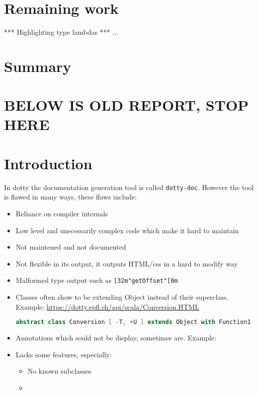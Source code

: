 \documentclass{report}
\begin{document}
\chapter{Remaining work}
*** Highlighting type lambdas
*** ...

\chapter{Summary}

























\chapter{BELOW IS OLD REPORT, STOP HERE}

\chapter{Introduction}
In dotty the documentation generation tool is called \texttt{dotty-doc}. However the tool is flawed in many ways, these flaws include:
\begin{itemize}
    \item Reliance on compiler internals
    \item Low level and unecessarily complex code which make it hard to maintain
    \item Not maintened and not documented
    \item Not flexible in its output, it outputs HTML/css in a hard to modify way
    \item Malformed type output such as \texttt{[32m"getOffset"[0m}
    \item Classes often show to be extending Object instead of their superclass. Example: \url{https://dotty.epfl.ch/api/scala/Conversion.HTML}
\begin{lstlisting}[language=scala]
abstract class Conversion [ -T, +U ] extends Object with Function1
\end{lstlisting}
    \item Annotations which sould not be display, sometimes are. Example:
    \item Lacks some features, especially:
    \begin{itemize}
        \item No known subclasses
        \item 
    \end{itemize}
\end{itemize}
\end{document}
